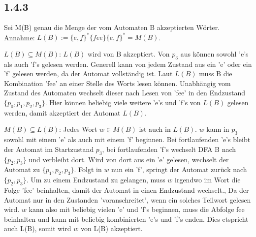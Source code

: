 \documentclass{article}
\begin{document}
\subsection*{1.4.3}
Sei M(B) genau die Menge der vom Automaten B akzeptierten Wörter. Annahme: $L(B) := \{e,f\}^*\{fee\}\{e,f\}^* = M(B)$.


$L(B) \subseteq M(B)$: $L(B)$ wird von B akzeptiert. Von $p_3$ aus können sowohl 'e's als auch 'f's gelesen werden. 
Generell kann von jedem Zustand aus ein 'e' oder ein 'f' gelesen werden, da der Automat vollständig ist. 
Laut $L(B)$ muss B die Kombination 'fee' an einer Stelle des Worts lesen können. Unabhängig vom Zustand 
des Automaten wechselt dieser nach Lesen von 'fee' in den Endzustand $\{p_0, p_1, p_2, p_3\}$. Hier 
können beliebig viele weitere 'e's und 'f's von $L(B)$ gelesen werden, damit akzeptiert der Automat $L(B)$.
 

$M(B) \subseteq L(B)$: Jedes Wort $w \in M(B)$ ist auch in $L(B)$. $w$ kann in $p_3$ sowohl mit 
einem 'e' als auch mit einem 'f' beginnen. Bei fortlaufenden 'e's bleibt der Automat im Startzustand 
$p_3$, bei fortlaufenden 'f's wechselt DFA B nach $\{p_2, p_3\}$ und verbleibt dort. Wird von dort aus 
ein 'e' gelesen, wechselt der Automat zu $\{p_1, p_2, p_3\}$. Folgt in $w$ nun ein 'f', springt der 
Automat zurück nach $\{p_2, p_3\}$. Um zu einem Endzustand zu gelangen, muss $w$ irgendwo im Wort 
die Folge 'fee' beinhalten, damit der Automat in einen Endzustand wechselt., Da der Automat nur 
in den Zustanden 'voranschreitet', wenn ein solches Teilwort gelesen wird. $w$ kann also mit beliebig 
vielen 'e' und 'f's beginnen, muss die Abfolge {fee} beinhalten und kann mit beliebig kombinierten 
'e's und 'f's enden. Dies etspricht auch L(B), somit wird $w$ von L(B) akzeptiert.


 
\end{document}

